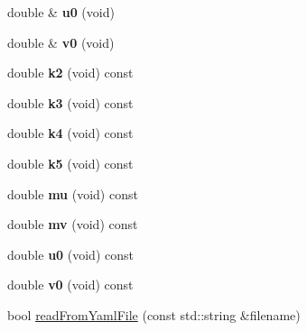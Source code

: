 \begin{DoxyCompactItemize}
double \& {\bfseries u0} (void)
\item 
\mbox{\label{classcamodocal_1_1EquidistantCamera_1_1Parameters_afa1ef85d0ec691aeedbcaa7a4e48dc04}} 
double \& {\bfseries v0} (void)
\item 
\mbox{\label{classcamodocal_1_1EquidistantCamera_1_1Parameters_aaccaefef8747752f675038c860335692}} 
double {\bfseries k2} (void) const
\item 
\mbox{\label{classcamodocal_1_1EquidistantCamera_1_1Parameters_a3376730c52f4abaa71ed2c19fff90bb0}} 
double {\bfseries k3} (void) const
\item 
\mbox{\label{classcamodocal_1_1EquidistantCamera_1_1Parameters_adbb9572bc324ce068ff0e27971a084c6}} 
double {\bfseries k4} (void) const
\item 
\mbox{\label{classcamodocal_1_1EquidistantCamera_1_1Parameters_a803092364244f93cc40fbadd5738991d}} 
double {\bfseries k5} (void) const
\item 
\mbox{\label{classcamodocal_1_1EquidistantCamera_1_1Parameters_a24ebd2082c2bf04884853147888f96d6}} 
double {\bfseries mu} (void) const
\item 
\mbox{\label{classcamodocal_1_1EquidistantCamera_1_1Parameters_a1b160f583cff389143ae7acd30f77d7f}} 
double {\bfseries mv} (void) const
\item 
\mbox{\label{classcamodocal_1_1EquidistantCamera_1_1Parameters_a462dd2e79be756ae382ab3c810fa2663}} 
double {\bfseries u0} (void) const
\item 
\mbox{\label{classcamodocal_1_1EquidistantCamera_1_1Parameters_a8d4b50c0874f16ccd6237e2ec05197bd}} 
double {\bfseries v0} (void) const
\item 
bool \hyperlink{classcamodocal_1_1EquidistantCamera_1_1Parameters_a66d75d7cc90bd65120ca10914b38b935}{read\+From\+Yaml\+File} (const std\+::string \&filename)

\end{DoxyCompactItemize}
